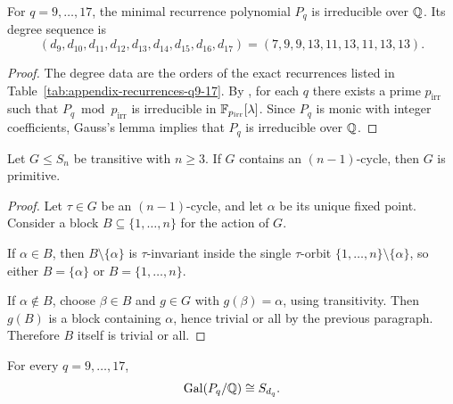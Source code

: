 \begin{proposition}
\label{prop:irreducibility-window}
For \(q=9,\dots,17\), the minimal recurrence polynomial \(P_q\) is irreducible
over \(\mathbb{Q}\).  Its degree sequence is
\[
  (d_9,d_{10},d_{11},d_{12},d_{13},d_{14},d_{15},d_{16},d_{17})
  =(7,9,9,13,11,13,11,13,13).
\]
\end{proposition}

\begin{proof}
The degree data are the orders of the exact recurrences listed in
Table~\ref{tab:appendix-recurrences-q9-17}.  By
, for each \(q\) there exists a prime
\(p_{\mathrm{irr}}\) such that \(P_q\bmod p_{\mathrm{irr}}\) is irreducible in
\(\mathbb{F}_{p_{\mathrm{irr}}}[\lambda]\).  Since \(P_q\) is monic with integer
coefficients, Gauss's lemma implies that \(P_q\) is irreducible over \(\mathbb{Q}\).
\end{proof}

\begin{lemma}
\label{lem:nminus1-cycle-primitive}
Let \(G\le S_n\) be transitive with \(n\ge 3\).  If \(G\) contains an
\((n-1)\)-cycle, then \(G\) is primitive.
\end{lemma}

\begin{proof}
Let \(\tau\in G\) be an \((n-1)\)-cycle, and let \(\alpha\) be its unique fixed
point.  Consider a block \(B\subseteq\{1,\dots,n\}\) for the action of \(G\).

If \(\alpha\in B\), then \(B\setminus\{\alpha\}\) is \(\tau\)-invariant inside the
single \(\tau\)-orbit \(\{1,\dots,n\}\setminus\{\alpha\}\), so either
\(B=\{\alpha\}\) or \(B=\{1,\dots,n\}\).

If \(\alpha\notin B\), choose \(\beta\in B\) and \(g\in G\) with \(g(\beta)=\alpha\),
using transitivity.  Then \(g(B)\) is a block containing \(\alpha\), hence
trivial or all by the previous paragraph.  Therefore \(B\) itself is trivial or
all.
\end{proof}

\begin{theorem}
\label{thm:galois-sd-window}
For every \(q=9,\dots,17\),
\[
  \operatorname{Gal}(P_q/\mathbb{Q})\cong S_{d_q}.
\]
\end{theorem}

